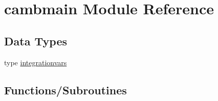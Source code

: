 \hypertarget{namespacecambmain}{}\section{cambmain Module Reference}
\label{namespacecambmain}
\subsection*{Data Types}
\begin{DoxyCompactItemize}
\item 
type \mbox{\hyperlink{structcambmain_1_1integrationvars}{integrationvars}}
\end{DoxyCompactItemize}
\subsection*{Functions/\+Subroutines}
